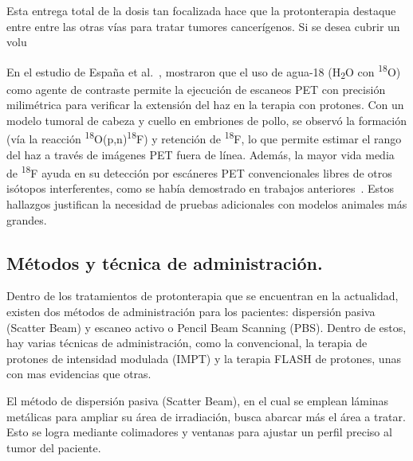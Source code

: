 \documentclass[onecolumn,12pt]{article} %
\begin{document}
Esta entrega total de la dosis tan focalizada hace que la protonterapia destaque entre entre las otras vías para tratar tumores cancerígenos. Si se desea cubrir un volu



En el estudio de España et al.~\cite{parceriza}, mostraron que el uso de agua-18 (H\textsubscript{2}O con \textsuperscript{18}O) como agente de contraste permite la ejecución de escaneos PET con precisión milimétrica para verificar la extensión del haz en la terapia con protones. Con un modelo tumoral de cabeza y cuello en embriones de pollo, se observó la formación (vía la reacción \textsuperscript{18}O(p,n)\textsuperscript{18}F) y retención de \textsuperscript{18}F, lo que permite estimar el rango del haz a través de imágenes PET fuera de línea. Además, la mayor vida media de \textsuperscript{18}F ayuda en su detección por escáneres PET convencionales libres de otros isótopos interferentes, como se había demostrado en trabajos anteriores~\cite{espana2021}. Estos hallazgos justifican la necesidad de pruebas adicionales con modelos animales más grandes.





 
\subsection{ Métodos y técnica de administración.}
Dentro de los tratamientos de protonterapia que se encuentran en la actualidad, existen dos métodos de administración para los pacientes: dispersión pasiva (Scatter Beam) y escaneo activo o Pencil Beam Scanning (PBS). Dentro de estos, hay varias técnicas de administración, como la convencional, la terapia de protones de intensidad modulada (IMPT) y la terapia FLASH de protones, unas con mas evidencias que otras. 

El método de dispersión pasiva (Scatter Beam), en el cual se emplean láminas metálicas para ampliar su área de irradiación, busca abarcar más el área a tratar. Esto se logra mediante colimadores y ventanas para ajustar un perfil preciso al tumor del paciente.
\end{document}
